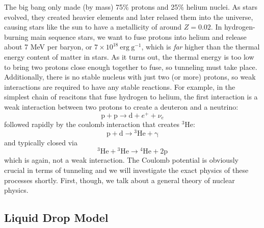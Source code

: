 \documentclass[10pt]{article}
\numberwithin{equation}{section}
\begin{document}
  The big bang only made (by mass) 75\% protons and 25\% helium nuclei. As
  stars evolved, they created heavier elements and later relased them
  into the universe, causing stars like the sun to have a metallicity
  of around $Z=0.02$. In hydrogen-burning main sequence
  stars, we want to fuse protons into helium and release about 7 MeV
  per baryon, or $7\times 10^{18}\ \mathrm{erg\ g^{-1}}$, which is
  \emph{far} higher than the thermal energy content of matter in
  stars. As it turns out, the thermal energy is too low to bring two
  protons close enough together to fuse, so tunneling must take
  place. Additionally, there is no stable nucleus with just two (or
  more) protons, so weak interactions are required to have any stable
  reactions. For example, in the simplest chain of reacitons that fuse
  hydrogen to helium, the first interaction is a weak interaction
  between two protons to create a deuteron and a neutrino:
  \begin{equation}
    \label{eq:364}
    \mathrm{p+p\to d+}e^++\nu_e
  \end{equation}
  followed rapidly by the coulomb interaction that creates
  ${}^3\mathrm{He}$:
  \begin{equation}
    \label{eq:365}
    \mathrm{p+d\to{}^3He+\gamma}
  \end{equation}
  and typically closed via
  \begin{equation}
    \label{eq:366}
    \mathrm{{}^3He+{}^3He\to{}^4He+2p}
  \end{equation}
  which is again, not a weak interaction. The Coulomb potential is
  obviously crucial in terms of tunneling and we will investigate the
  exact physics of these processes shortly. First, though, we talk
  about a general theory of nuclear physics.
  \subsection{Liquid Drop Model}
  \label{sec:liquid-drop-model}
\end{document}
